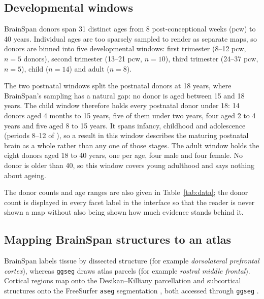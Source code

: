 \documentclass[pdflatex,sn-basic]{sn-jnl}
\begin{document}
\subsection{Developmental windows}\label{sec:ages}

BrainSpan donors span 31 distinct ages from 8 post-conceptional weeks (pcw) to
40 years. Individual ages are too sparsely sampled to render as separate maps,
so donors are binned into five developmental windows: first trimester (8--12
pcw, $n=5$ donors), second trimester (13--21 pcw, $n=10$), third trimester
(24--37 pcw, $n=5$), child ($n=14$) and adult ($n=8$).

The two postnatal windows split the postnatal donors at 18 years, where
BrainSpan's sampling has a natural gap: no donor is aged between 15 and 18
years. The child window therefore holds every postnatal donor under 18: 14
donors aged 4 months to 15 years, five of them under two years, four aged 2 to
4 years and five aged 8 to 15 years. It spans infancy, childhood and
adolescence (periods 8--12 of \citealp{Kang2011}), so a result in this window
describes the maturing postnatal brain as a whole rather than any one of those
stages. The adult window holds the eight donors aged 18 to 40
years, one per age, four male and four female. No donor is older than 40, so
this window covers young adulthood and says nothing about ageing.

The donor counts and age ranges are also given in Table~\ref{tab:data}; the
donor count is displayed in every facet label in the
interface so that the reader is never shown a map without also being shown how
much evidence stands behind it.

\subsection{Mapping BrainSpan structures to an atlas}\label{sec:mapping}

BrainSpan labels tissue by dissected structure (for example \emph{dorsolateral
prefrontal cortex}), whereas \texttt{ggseg} draws atlas parcels (for example
\emph{rostral middle frontal}). Cortical regions map onto the Desikan--Killiany parcellation
\citep{Desikan2006} and subcortical structures onto the FreeSurfer
\texttt{aseg} segmentation \citep{Fischl2002}, both accessed through
\texttt{ggseg} \citep{Mowinckel2020}.
\end{document}
